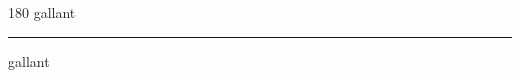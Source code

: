 
\begin{frame}
\begin{center}
\begin{turn}{180}
{\fontsize{2.5cm}{1em}\selectfont gallant}
\end{turn}
\vspace{1em}\par  
\hrule
\vspace{1em}\par  
{\fontsize{2.5cm}{1em}\selectfont gallant}
\end{center}
\end{frame}
